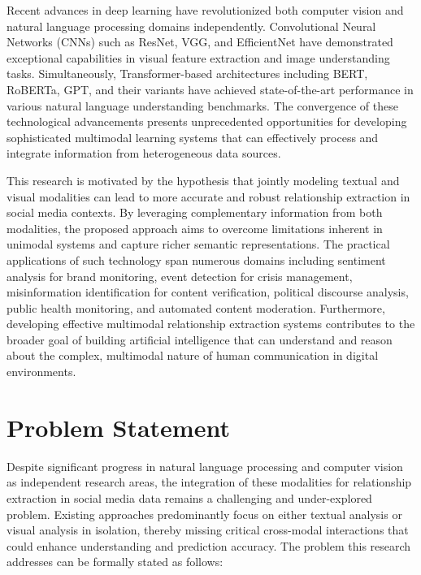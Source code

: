 \documentclass[12pt,a4paper]{report}
\begin{document}
Recent advances in deep learning have revolutionized both computer vision and natural language processing domains independently. Convolutional Neural Networks (CNNs) such as ResNet, VGG, and EfficientNet have demonstrated exceptional capabilities in visual feature extraction and image understanding tasks. Simultaneously, Transformer-based architectures including BERT, RoBERTa, GPT, and their variants have achieved state-of-the-art performance in various natural language understanding benchmarks. The convergence of these technological advancements presents unprecedented opportunities for developing sophisticated multimodal learning systems that can effectively process and integrate information from heterogeneous data sources.

This research is motivated by the hypothesis that jointly modeling textual and visual modalities can lead to more accurate and robust relationship extraction in social media contexts. By leveraging complementary information from both modalities, the proposed approach aims to overcome limitations inherent in unimodal systems and capture richer semantic representations. The practical applications of such technology span numerous domains including sentiment analysis for brand monitoring, event detection for crisis management, misinformation identification for content verification, political discourse analysis, public health monitoring, and automated content moderation. Furthermore, developing effective multimodal relationship extraction systems contributes to the broader goal of building artificial intelligence that can understand and reason about the complex, multimodal nature of human communication in digital environments.

\section{Problem Statement}

Despite significant progress in natural language processing and computer vision as independent research areas, the integration of these modalities for relationship extraction in social media data remains a challenging and under-explored problem. Existing approaches predominantly focus on either textual analysis or visual analysis in isolation, thereby missing critical cross-modal interactions that could enhance understanding and prediction accuracy. The problem this research addresses can be formally stated as follows:
\end{document}
